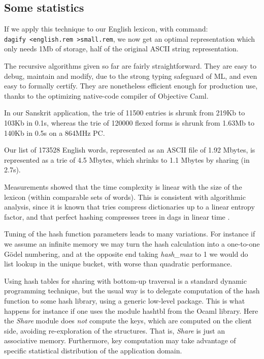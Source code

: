 \subsection{Some statistics}

\vspace*{15pt}

If we apply this technique to our English lexicon, with command:\\
\verb:dagify <english.rem >small.rem:, we now get an optimal
representation which only needs 1Mb of storage, half of the
original ASCII string representation.

The recursive algorithms given so far are fairly straightforward. 
They are easy to debug, maintain and modify,
due to the strong typing safeguard of ML, and even easy to formally certify. 
They are nonetheless efficient enough for production use, thanks to the
optimizing native-code compiler of Objective Caml. 

In our Sanskrit application, the trie of 11500 entries
is shrunk from 219Kb to 103Kb in 0.1s, whereas the trie of 120000 flexed
forms is shrunk from 1.63Mb to 140Kb in 0.5s on a 864MHz PC.

Our list of 173528 English words, represented as an ASCII file of 1.92
Mbytes, is represented as a trie of 4.5 Mbytes, which shrinks to 1.1
Mbytes by sharing (in 2.7s).

Measurements showed that the time complexity is linear with the size of
the lexicon (within comparable sets of words). This is consistent with
algorithmic analysis, since it is known that tries compress dictionaries
up to a linear entropy factor, and that perfect hashing compresses trees
in dags in linear time \cite{flajsipste}.

Tuning of the hash function parameters leads to many variations.
For instance if we assume an infinite memory we may turn the hash calculation
into a one-to-one G\"odel numbering, and at the opposite end taking
{\sl hash\_max} to 1 we would do list lookup in the unique bucket,
with worse than quadratic performance. 

Using hash tables for sharing with bottom-up traversal is a standard
dynamic programming technique, but the usual 
way is to delegate computation of the hash function to some hash library,
using a generic low-level package. This is what happens for instance
if one uses the module hashtbl from the Ocaml library. Here the 
{\sl Share} module does {\sl not} compute the keys, which are computed
on the client side, avoiding re-exploration of the structures. That is,
{\sl Share} is just an associative memory. Furthermore, key computation may 
take advantage of specific statistical distribution of the application domain.

